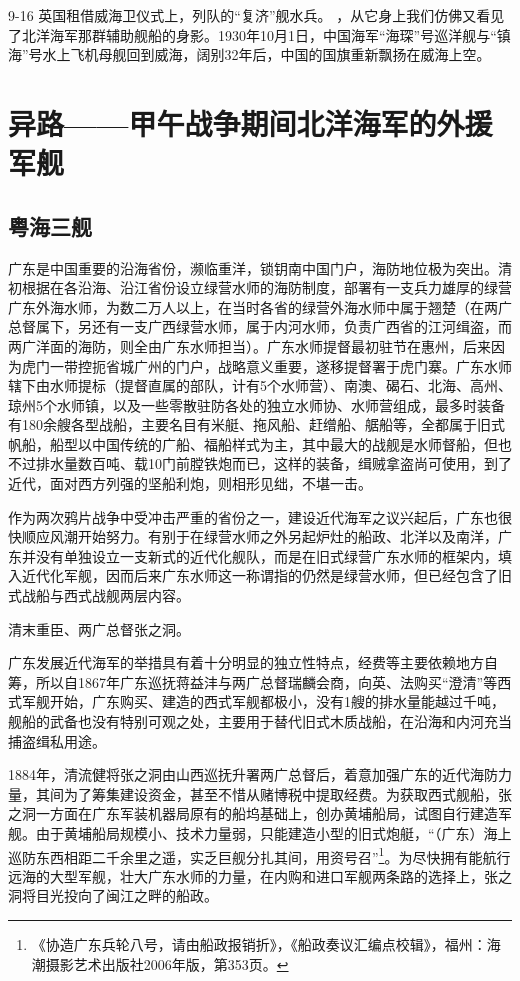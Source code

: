 \documentclass[12pt,UTF8]{ctexbook}
\begin{document}
9-16 英国租借威海卫仪式上，列队的“复济”舰水兵。
，从它身上我们仿佛又看见了北洋海军那群辅助舰船的身影。1930年10月1日，中国海军“海琛”号巡洋舰与“镇海”号水上飞机母舰回到威海，阔别32年后，中国的国旗重新飘扬在威海上空。

\chapter{异路——甲午战争期间北洋海军的外援军舰}

\section{粤海三舰}

广东是中国重要的沿海省份，濒临重洋，锁钥南中国门户，海防地位极为突出。清初根据在各沿海、沿江省份设立绿营水师的海防制度，部署有一支兵力雄厚的绿营广东外海水师，为数二万人以上，在当时各省的绿营外海水师中属于翘楚（在两广总督属下，另还有一支广西绿营水师，属于内河水师，负责广西省的江河缉盗，而两广洋面的海防，则全由广东水师担当）。广东水师提督最初驻节在惠州，后来因为虎门一带控扼省城广州的门户，战略意义重要，遂移提督署于虎门寨。广东水师辖下由水师提标（提督直属的部队，计有5个水师营）、南澳、碣石、北海、高州、琼州5个水师镇，以及一些零散驻防各处的独立水师协、水师营组成，最多时装备有180余艘各型战船，主要名目有米艇、拖风船、赶缯船、艍船等，全都属于旧式帆船，船型以中国传统的广船、福船样式为主，其中最大的战舰是水师督船，但也不过排水量数百吨、载10门前膛铁炮而已，这样的装备，缉贼拿盗尚可使用，到了近代，面对西方列强的坚船利炮，则相形见绌，不堪一击。

作为两次鸦片战争中受冲击严重的省份之一，建设近代海军之议兴起后，广东也很快顺应风潮开始努力。有别于在绿营水师之外另起炉灶的船政、北洋以及南洋，广东并没有单独设立一支新式的近代化舰队，而是在旧式绿营广东水师的框架内，填入近代化军舰，因而后来广东水师这一称谓指的仍然是绿营水师，但已经包含了旧式战船与西式战舰两层内容。

清末重臣、两广总督张之洞。

广东发展近代海军的举措具有着十分明显的独立性特点，经费等主要依赖地方自筹，所以自1867年广东巡抚蒋益沣与两广总督瑞麟会商，向英、法购买“澄清”等西式军舰开始，广东购买、建造的西式军舰都极小，没有1艘的排水量能越过千吨，舰船的武备也没有特别可观之处，主要用于替代旧式木质战船，在沿海和内河充当捕盗缉私用途。

1884年，清流健将张之洞由山西巡抚升署两广总督后，着意加强广东的近代海防力量，其间为了筹集建设资金，甚至不惜从赌博税中提取经费。为获取西式舰船，张之洞一方面在广东军装机器局原有的船坞基础上，创办黄埔船局，试图自行建造军舰。由于黄埔船局规模小、技术力量弱，只能建造小型的旧式炮艇，“（广东）海上巡防东西相距二千余里之遥，实乏巨舰分扎其间，用资号召”\footnote{《协造广东兵轮八号，请由船政报销折》，《船政奏议汇编点校辑》，福州：海潮摄影艺术出版社2006年版，第353页。}。为尽快拥有能航行远海的大型军舰，壮大广东水师的力量，在内购和进口军舰两条路的选择上，张之洞将目光投向了闽江之畔的船政。
\end{document}
